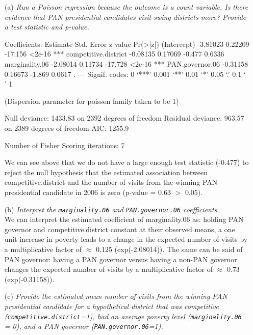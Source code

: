 \documentclass[12pt,letterpaper]{article}
\begin{document}
\begin{enumerate}
	\item [(a)]
	\emph{Run a Poisson regression because the outcome is a count variable. Is there evidence that PAN presidential candidates visit swing districts more? Provide a test statistic and p-value.}
	
	  
	
	\begin{verbnobox}[\footnotesize]
		Coefficients:
		Estimate Std. Error z value Pr(>|z|)    
(Intercept)          -3.81023    0.22209 -17.156   <2e-16 ***
competitive.district -0.08135    0.17069  -0.477   0.6336    
marginality.06       -2.08014    0.11734 -17.728   <2e-16 ***
PAN.governor.06      -0.31158    0.16673  -1.869   0.0617 .    
		---
		Signif. codes:  0 ‘***’ 0.001 ‘**’ 0.01 ‘*’ 0.05 ‘.’ 0.1 ‘ ’ 1
		
		(Dispersion parameter for poisson family taken to be 1)
		
		Null deviance: 1433.83  on 2392  degrees of freedom
		Residual deviance:  963.57  on 2389  degrees of freedom
		AIC: 1255.9
		
		Number of Fisher Scoring iterations: 7
	\end{verbnobox}			
	
	We can see above that we do not have a large enough test statistic (-0.477) to reject the null hypothesis that the estimated association between competitive.district and the number of visits from the winning PAN presidential candidate in 2006 is zero (p-value = 0.63 $>$ 0.05).\\
	\newpage
	\item [(b)]
	\emph{Interpret the \texttt{marginality.06} and \texttt{PAN.governor.06} coefficients.}\\
	
	We can interpret the estimated coefficient of marginality.06 as: holding PAN governor and competitive.district constant at their observed means, a one unit increase in poverty leads to a change in the expected number of visits by a multiplicative factor of $\approx$ 0.125 (exp(-2.08014)). The same can be said of PAN governor: having a PAN governor versus having a non-PAN governor changes the expected number of visits by a multiplicative factor of $\approx$ 0.73 (exp(-0.31158)).\\
	
	\item [(c)]
	\emph{Provide the estimated mean number of visits from the winning PAN presidential candidate for a hypothetical district that was competitive (\texttt{competitive.district}=1), had an average poverty level (\texttt{marginality.06} = 0), and a PAN governor (\texttt{PAN.governor.06}=1).}\\
	

\end{enumerate}
\end{document}
